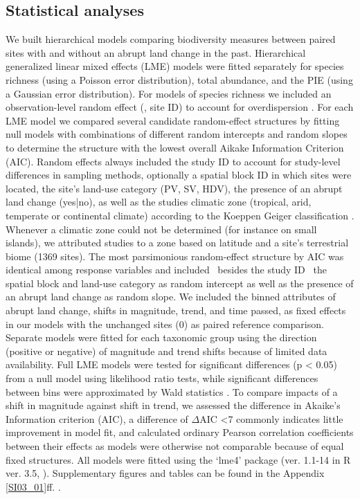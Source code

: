 \subsection{Statistical analyses} 
\label{C03_0204}
We built hierarchical models comparing biodiversity measures between paired sites with and without an abrupt land change in the past. Hierarchical generalized linear mixed effects (LME) models were fitted separately for species richness (using a Poisson error distribution), total abundance, and the PIE (using a Gaussian error distribution). For models of species richness we included an observation-level random effect (\ie, site ID) to account for overdispersion  \citep{Harrison2015}. For each LME model we compared several candidate random-effect structures by fitting null models with combinations of different random intercepts and random slopes to determine the structure with the lowest overall Aikake Information Criterion (AIC). Random effects always included the study ID to account for study-level differences in sampling methods, optionally a spatial block ID in which sites were located, the site’s land-use category (PV, SV, HDV), the presence of an abrupt land change (yes|no), as well as the studies climatic zone (tropical, arid, temperate or continental climate) according to the Koeppen Geiger classification \citep{Peel2007}. Whenever a climatic zone could not be determined (for instance on small islands), we attributed studies to a zone based on latitude and a site’s terrestrial biome (1369 sites). The most parsimonious random-effect structure by AIC was identical among response variables and included \textendash\ besides the study ID \textendash\ the spatial block and land-use category as random intercept as well as the presence of an abrupt land change as random slope. We included the binned attributes of abrupt land change, \eg shifts in magnitude, trend, and time passed, as fixed effects in our models with the unchanged sites ($0$) as paired reference comparison. Separate models were fitted for each taxonomic group using the direction (positive or negative) of magnitude and trend shifts because of limited data availability. Full LME models were tested for significant differences (p < 0.05) from a null model using likelihood ratio tests, while significant differences between bins were approximated by Wald statistics \citep{lme4}. To compare impacts of a shift in magnitude against shift in trend, we assessed the difference in Akaike’s Information criterion (AIC), a difference of $\Delta$AIC <7 commonly indicates little improvement in model fit, and calculated ordinary Pearson correlation coefficients between their effects as models were otherwise not comparable because of equal fixed structures. All models were fitted using the ‘lme4’ package (ver. 1.1-14 in R ver. 3.5, \cite{lme4,RTeam2014}). Supplementary figures and tables can be found in the Appendix \ref{SI03_01}ff. .

